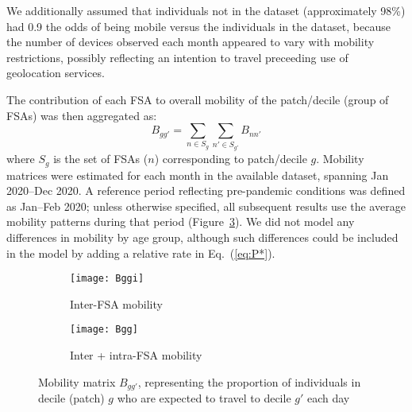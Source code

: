 We additionally assumed that individuals not in the dataset (approximately 98\%) had
0.9 the odds of being mobile versus the individuals in the dataset,
because the number of devices observed each month appeared to vary with mobility restrictions,
possibly reflecting an intention to travel preceeding use of geolocation services.
\par
The contribution of each FSA to overall mobility of the patch/decile (group of FSAs)
was then aggregated as:
\begin{equation}\label{eq:Bgg}
  B_{gg'} = \sum_{n \in S_g}\sum_{n' \in S_{g'}} B_{nn'}
\end{equation}
where $S_g$ is the set of FSAs ($n$) corresponding to patch/decile $g$.
Mobility matrices were estimated for each month in the available dataset,
spanning Jan 2020--Dec 2020.
A reference period reflecting pre-pandemic conditions was defined as Jan--Feb 2020;
unless otherwise specified, all subsequent results use the average mobility patterns during that period
(Figure~\ref{fig:Bgg}).
We did not model any differences in mobility by age group,
although such differences could be included in the model by adding a relative rate in Eq.~(\ref{eq:P*}).
\begin{figure}
  \centering
  \begin{subfigure}{0.49\linewidth}
    \texttt{[image: Bggi]}
    \caption{Inter-FSA mobility}
    \label{fig:Bggo}
  \end{subfigure}\hfill%
  \begin{subfigure}{0.49\linewidth}
    \texttt{[image: Bgg]}
    \caption{Inter + intra-FSA mobility}
    \label{fig:Bggd}
  \end{subfigure}
  \caption{Mobility matrix $B_{gg'}$, representing
    the proportion of individuals in decile (patch) $g$ who are expected to travel to decile $g'$ each day}
  \label{fig:Bgg}
\end{figure}
